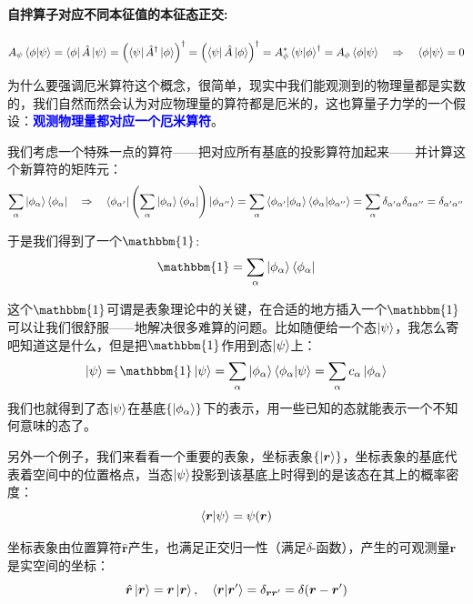 \paragraph*{自拌算子对应不同本征值的本征态正交:}
\[A_{\psi}\bra{\phi}\ket{\psi}=\bra{\phi}\hat{A}\ket{\psi}=\left(\bra{\psi}\hat{A}^{\dagger}\ket{\phi}\right)^{\dagger}=\left(\bra{\psi}\hat{A}\ket{\phi}\right)^{\dagger}=A_{\phi}^*\bra{\psi}\ket{\phi}^{\dagger}=A_{\phi}\bra{\phi}\ket{\psi} \quad \Rightarrow \quad \bra{\phi}\ket{\psi}=0\]

为什么要强调厄米算符这个概念，很简单，现实中我们能观测到的物理量都是实数的，我们自然而然会认为对应物理量的算符都是厄米的，这也算量子力学的一个假设：\textcolor{blue}{\textbf{观测物理量都对应一个厄米算符}}。

我们考虑一个特殊一点的算符——把对应所有基底的投影算符加起来——并计算这个新算符的矩阵元：
\[\sum_{\alpha}\ket{\phi_{\alpha}}\bra{\phi_{\alpha}} \quad \Rightarrow \quad \bra{\phi_{\alpha'}}\left(\sum_{\alpha}\ket{\phi_{\alpha}}\bra{\phi_{\alpha}}\right)\ket{\phi_{\alpha''}}=\sum_{\alpha}\bra{\phi_{\alpha'}}\ket{\phi_{\alpha}}\bra{\phi_{\alpha}}\ket{\phi_{\alpha''}}=\sum_{\alpha}\delta_{\alpha'\alpha}\delta_{\alpha\alpha''}=\delta_{\alpha'\alpha''}\]

于是我们得到了一个$\mathbbm{1}$:
\[\mathbbm{1}=\sum_{\alpha}\ket{\phi_{\alpha}}\bra{\phi_{\alpha}}\]

这个$\mathbbm{1}$可谓是表象理论中的关键，在合适的地方插入一个$\mathbbm{1}$可以让我们很舒服——地解决很多难算的问题。比如随便给一个态$\ket{\psi}$，我怎么寄吧知道这是什么，但是把$\mathbbm{1}$作用到态$\ket{\psi}$上：
\[\ket{\psi}=\mathbbm{1}\ket{\psi}=\sum_{\alpha}\ket{\phi_{\alpha}}\bra{\phi_{\alpha}}\ket{\psi}=\sum_{\alpha}c_{\alpha}\ket{\phi_{\alpha}}\]
我们也就得到了态$\ket{\psi}$在基底$\{\ket{\phi_{\alpha}}\}$下的表示，用一些已知的态就能表示一个不知何意味的态了。

另外一个例子，我们来看看一个重要的表象，坐标表象$\{\ket{\bm{r}}\}$，坐标表象的基底代表着空间中的位置格点，当态$\ket{\psi}$投影到该基底上时得到的是该态在其上的概率密度：
\[\bra{\bm{r}}\ket{\psi}=\psi(\bm{r})\]

坐标表象由位置算符$\hat{\bm{r}}$产生，也满足正交归一性（满足$\delta$-函数），产生的可观测量$\bm{r}$是实空间的坐标：
\[\hat{\bm{r}}\ket{\bm{r}}=\bm{r}\ket{\bm{r}}, \quad \bra{\bm{r}}\ket{\bm{r}'}=\delta_{\bm{r}\bm{r}'}=\delta(\bm{r}-\bm{r}')\]

